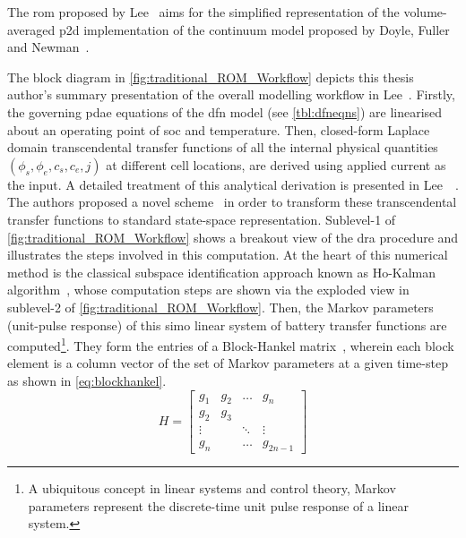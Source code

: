 The \gls{rom}  proposed by  Lee~\etal{} aims  for the  simplified representation
of  the    volume-averaged  \gls{p2d} implementation of the continuum  model  proposed  by  Doyle,
Fuller   and   Newman~\cite{Doyle1993,Fuller1994}.

The   block   diagram   in  \cref{fig:traditional_ROM_Workflow}   depicts   this
thesis  author's   summary  presentation  of  the   overall  modelling  workflow
in   Lee~\etal{}.   Firstly,  the   governing   \gls{pdae}   equations  of   the
\gls{dfn}   model    (see   \cref{tbl:dfneqns})   are   linearised    about   an
operating  point  of  \gls{soc}   and  temperature.  Then,  closed-form  Laplace
domain  transcendental   transfer  functions   of  all  the   internal  physical
quantities~$\left(\phi_{s},\phi_{e},c_{s},c_{e},j\right)$   at  different   cell
locations, are derived using applied current  as the input. A detailed treatment
of  this analytical  derivation is  presented in  Lee~\etal~\cite{Lee2012a}. The
authors  proposed  a novel    scheme~\cite{Lee2012b}  in order  to
transform  these  transcendental  transfer  functions  to  standard  state-space
representation.  Sublevel-1   of  \cref{fig:traditional_ROM_Workflow}   shows  a
breakout view of  the \gls{dra} procedure and illustrates the  steps involved in
this  computation. At  the  heart  of this  numerical  method  is the  classical
subspace  identification approach  known as  Ho-Kalman algorithm~\cite{HO1966a},
whose  computation steps  are  shown  via the  exploded  view  in sublevel-2  of
\cref{fig:traditional_ROM_Workflow}.  Then,  the Markov  parameters  (unit-pulse
response) of  this \gls{simo}  linear system of  battery transfer  functions are
computed\footnote{A  ubiquitous concept  in linear  systems and  control theory,
Markov parameters  represent the discrete-time  unit pulse response of  a linear
system.}.  They  form the  entries  of  a Block-Hankel  matrix~\cite{Ljung1998},
wherein each block  element is a column  vector of the set  of Markov parameters
at  a  given  time-step as shown in \cref{eq:blockhankel}.
\begin{equation}\label{eq:blockhankel}
    H = \begin{bmatrix}
        g_1    & g_2 & \dots  & g_n    \\
        g_2    & g_3 & {}     & {}     \\
        \vdots & {}  & \ddots & \vdots \\
        g_n    & {}  & \dots  & g_{2n-1}
    \end{bmatrix}
\end{equation}
